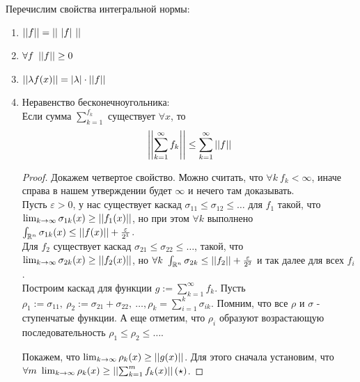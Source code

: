 \begin{statement*}
    Перечислим свойства интегральной нормы:
    \begin{enumerate} 
        \item $\abs{\abs{f}} = \abs{\abs{ \ \abs{f} \ }}$
        \item $\forall f \ \left| \left| f \right| \right| \ge 0$
        \item $\left| \left| \lambda f(x) \right| \right| = \left| \lambda \right|\cdot \left| \left| f \right| \right|$
        \item Неравенство бесконечноугольника:\\
        Если сумма $\sum_{k=1}^{f_k}$ существует $\forall x$, то
        \[\left| \left| \sum_{k=1}^{\infty} f_k \right| \right| \le \sum_{k=1}^{\infty}\left| \left| f \right| \right|\]
        \begin{proof}
            Докажем четвертое свойство. Можно считать, что $\forall k \ f_k < \infty$, иначе справа в нашем утверждении будет $\infty$ и нечего там доказывать.\\
            Пусть $\varepsilon > 0$, у нас существует каскад $\sigma_{11} \le \sigma_{12} \le \hdots$ для $f_1$ такой, что $\lim_{k \to \infty} \sigma_{1k}(x) \ge \left| \left| f_1(x) \right| \right|$, но при этом $\forall k$ выполнено $\int_{\mathbb{R}^n} \sigma_{1k}(x) \le \left| \left| f(x) \right| \right| + \frac{\varepsilon}{2^1}$. \\
            Для $f_2$ существует каскад $\sigma_{21} \le \sigma_{22} \le \hdots$, такой, что $\lim_{k \to \infty} \sigma_{2k}(x) \ge \left| \left| f_2(x) \right| \right|$, но $\forall k \ \int_{\mathbb{R}^n} \sigma_{2k} \le \left| \left| f_2 \right| \right| + \frac{\varepsilon}{2^2}$ и так далее для всех $f_i$.\\
            Построим каскад для функции $g:= \sum_{k=1}^{\infty}f_k$. Пусть $\rho_1 := \sigma_{11},\  \rho_2 := \sigma_{21} + \sigma_{22}, \ \hdots, \rho_k = \sum_{i=1}^{k}\sigma_{ik}$.
            Помним, что все $\rho$ и $\sigma$ - ступенчатые функции. А еще отметим, что $\rho_i$ образуют возрастающую последовательность
            $\rho_1 \le \rho_2 \le \hdots$.
            \par
            Покажем, что $\lim_{k \to \infty} \rho_k(x) \ge \left| \left| g(x) \right| \right|$. 
            Для этого сначала установим, что \\ $\forall m \ \lim_{k \to \infty} \rho_k(x) \ge \left| \left|  \sum_{k=1}^{m} f_k(x) \right| \right| (\star)$.


\end{proof}
\end{enumerate}
\end{statement*}
